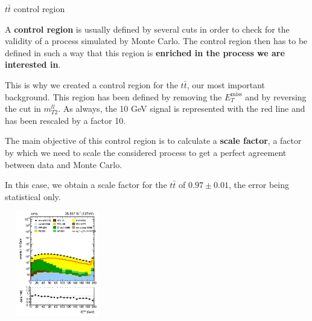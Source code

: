 \documentclass[8 pt]{beamer}
\begin{document}
\begin{frame}{$t \bar t$ control region}

	\justifying
	A \textbf{control region} is usually defined by several cuts in order to check for the validity of a process simulated by Monte Carlo. The control region then has to be defined in such a way that this region is \textbf{enriched in the process we are interested in}. \vfill
	
	This is why we created a control region for the $t \bar t$, our most important background. This region has been defined by removing the $E_T^{\text{miss}}$ and by reversing the cut in $m_{T2}^{ll}$. As always, the 10 GeV signal is represented with the red line and has been rescaled by a factor 10. \vfill

	\hspace{30pt}
   \begin{minipage}[c]{.42\linewidth}
   	\justifying
   	 The main objective of this control region is to calculate a \textbf{scale factor}, a factor by which we need to scale the considered process to get a perfect agreement between data and Monte Carlo.
	 \begin{block}{}
	 \justifying
	 In this case, we obtain a scale factor for the $t \bar t$ of $0.97 \pm 0.01$, the error being statistical only.
	 \end{block}
   \end{minipage} \hfill
    \begin{minipage}[c]{.48\linewidth}
	\begin{center}
	\includegraphics[width= 130pt, height= 130pt]{figs/metPfType1_log-ttCR2.png}
	\end{center}
   \end{minipage} \hfill \vfill

\end{frame}
\end{document}

